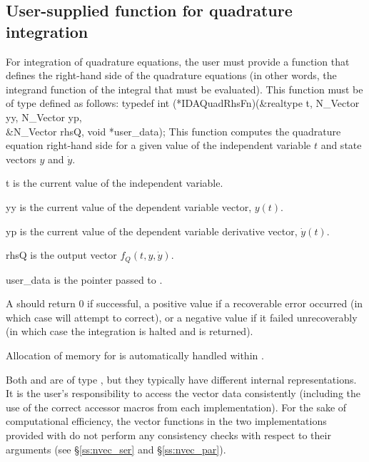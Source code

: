 {%

\subsection{User-supplied function for quadrature integration}
\label{ss:user_fct_quad}

For integration of quadrature equations, the user must provide a function
that defines the right-hand side of the quadrature equations (in other words,
the integrand function of the integral that must be evaluated). This function
must be of type  defined as follows:
{
  typedef int (*IDAQuadRhsFn)(&realtype t, N\_Vector yy, N\_Vector yp,\\
                             &N\_Vector rhsQ, void *user\_data);
}
{
  This function computes the quadrature equation right-hand side for a given value
  of the independent variable $t$ and state vectors $y$ and $\dot{y}$.
}
{
  \begin{args}
  \item[t]
    is the current value of the independent variable.
  \item[yy]
    is the current value of the dependent variable vector, $y(t)$.
  \item[yp]
    is the current value of the dependent variable derivative vector, $\dot{y}(t)$.
  \item[rhsQ]
    is the output vector $f_Q(t,y,\dot{y})$.
  \item[user\_data]
    is the  pointer passed to .
  \end{args}
}
{
  A  should return 0 if successful, a positive value if a recoverable
  error occurred (in which case {\idas} will attempt to correct), or a negative
  value if it failed unrecoverably (in which case the integration is halted and
   is returned).
}
{
  Allocation of memory for  is automatically handled within {\idas}.

  Both  and  are of type ,
  but they  typically have different internal representations. It is the user's
  responsibility to access the vector data consistently (including the use of the
  correct accessor macros from each {\nvector} implementation). For the sake of
  computational efficiency, the vector functions in the two {\nvector} implementations
  provided with {\idas} do not perform any consistency checks with respect to their
   arguments (see \S\ref{ss:nvec_ser} and \S\ref{ss:nvec_par}).

}}
